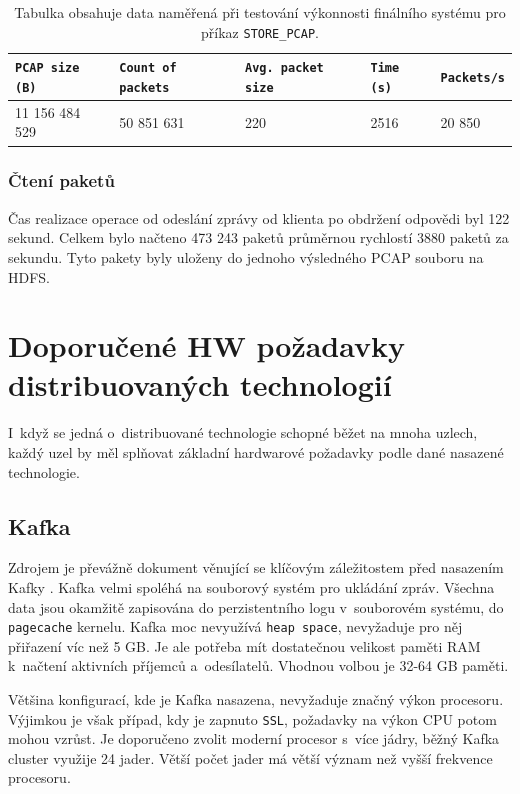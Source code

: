 \begin{table}[h!]
    \centering
    \begin{tabular}{| l | l | l | l | l |}
    \hline
    \texttt{PCAP size (B)}   &   \texttt{Count of packets}   &   \texttt{Avg. packet size} &  \texttt{Time (s)} &   \texttt{Packets/s} \\ \hline
    11 156 484 529 & 50 851 631 & 220 & 2516 & 20 850 \\ \hline
    \end{tabular}\par
    \bigskip
    \caption{Tabulka obsahuje data naměřená při testování výkonnosti finálního systému pro příkaz \texttt{STORE\_PCAP}.}
    \label{tablePerformanceFinalSystemBigData}
\end{table}

\subsubsection{Čtení paketů}
Čas realizace operace od odeslání zprávy od klienta po obdržení odpovědi byl 122 sekund. Celkem bylo načteno 473 243 paketů průměrnou rychlostí 3880 paketů za sekundu. Tyto pakety byly uloženy do jednoho výsledného PCAP souboru na HDFS.

\section{Doporučené HW požadavky distribuovaných technologií}
I~když se jedná o~distribuované technologie schopné běžet na mnoha uzlech, každý uzel by měl splňovat základní hardwarové požadavky podle dané nasazené technologie.

\subsection{Kafka}
Zdrojem je převážně dokument věnující se klíčovým záležitostem před nasazením Kafky \cite{kafkaDeployment}. Kafka velmi spoléhá na souborový systém pro ukládání zpráv. Všechna data jsou okamžitě zapisována do perzistentního logu v~souborovém systému, do \texttt{pagecache} kernelu. Kafka moc nevyužívá \texttt{heap space}, nevyžaduje pro něj přiřazení víc než 5 GB.
Je ale potřeba mít dostatečnou velikost paměti RAM k~načtení aktivních příjemců a~odesílatelů. Vhodnou volbou je 32-64 GB paměti.

Většina konfigurací, kde je Kafka nasazena, nevyžaduje značný výkon procesoru. Výjimkou je však případ, kdy je zapnuto \texttt{SSL}, požadavky na výkon CPU potom mohou vzrůst. Je doporučeno zvolit moderní procesor s~více jádry, běžný Kafka cluster využije 24 jader. Větší počet jader má větší význam než vyšší frekvence procesoru.

